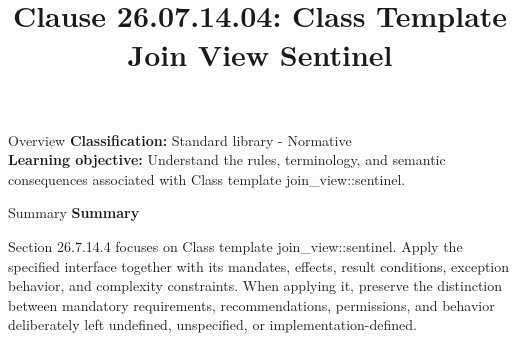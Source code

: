 \documentclass[10pt,letterpaper]{article}
\title{Clause 26.07.14.04: Class Template Join View Sentinel}
\author{}
\date{}
\begin{document}
\maketitle
\begin{CornellOverviewBox}{Overview}
\textbf{Classification:} Standard library - Normative\\[2pt]
\textbf{Learning objective:} Understand the rules, terminology, and semantic consequences associated with Class template join\_view::sentinel.
\end{CornellOverviewBox}\begin{CornellSummaryBox}{Summary}
{\sffamily\bfseries\color{Accent} Summary}\par\vspace{3pt}Section 26.7.14.4 focuses on Class template join\_view::sentinel. Apply the specified interface together with its mandates, effects, result conditions, exception behavior, and complexity constraints. When applying it, preserve the distinction between mandatory requirements, recommendations, permissions, and behavior deliberately left undefined, unspecified, or implementation-defined.
\end{CornellSummaryBox}
\end{document}
